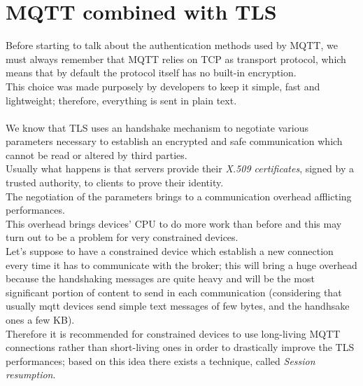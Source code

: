 \documentclass[12pt]{report}
\begin{document}
{\clearpage

\section{MQTT combined with TLS}
\bigskip
Before starting to talk about the authentication methods used by MQTT, we must always remember that MQTT relies on TCP as transport protocol, which means that by default the protocol itself has no built-in encryption.\\
This choice was made purposely by developers to keep it simple, fast and lightweight; therefore, everything is sent in plain text.\\\\
We know that TLS uses an handshake mechanism to negotiate various parameters necessary to establish an encrypted and safe communication which cannot be read or altered by third parties.\\
Usually what happens is that servers provide their \emph{X.509 certificates}, signed by a trusted authority, to clients to prove their identity.\\
The negotiation of the parameters brings to a communication overhead afflicting performances.\\
This overhead brings devices' CPU to do more work than before and this may turn out to be a problem for very constrained devices.\\
Let's suppose to have a constrained device which establish a new connection every time it has to communicate with the broker; this will bring a huge overhead because the handshaking messages are quite heavy and will be the most significant portion of content to send in each communication (considering that usually mqtt devices send simple text messages of few bytes, and the handhsake ones a few KB).\\
Therefore it is recommended for constrained devices to use long-living MQTT connections rather than short-living ones in order to drastically improve the TLS performances; based on this idea there exists a technique, called \emph{Session resumption}.

}
\end{document}
